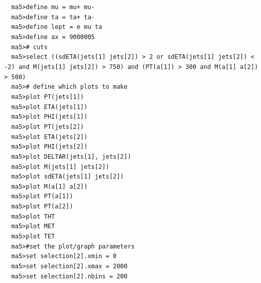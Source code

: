 \documentclass[a4paper, 10pt]{article}
\begin{document}
\texttt{ }\texttt{ }\texttt{ma5>define mu = mu+ mu-\\
}
\texttt{ }\texttt{ }\texttt{ma5>define ta = ta+ ta-\\
}
\texttt{ }\texttt{ }\texttt{ma5>define lept = e mu ta\\
}
\texttt{ }\texttt{ }\texttt{ma5>define ax = 9000005\\
}
\texttt{ }\texttt{ }\texttt{ma5>\# cuts\\
}
\texttt{ }\texttt{ }\texttt{ma5>select ((sdETA(jets[1] jets[2]) > 2 or sdETA(jets[1] jets[2]) < -2) and M(jets[1] jets[2]) > 750) and (PT(a[1]) > 300 and M(a[1] a[2]) > 500)\\
}
\texttt{ }\texttt{ }\texttt{ma5>\# define which plots to make\\
}
\texttt{ }\texttt{ }\texttt{ma5>plot PT(jets[1])\\
}
\texttt{ }\texttt{ }\texttt{ma5>plot ETA(jets[1])\\
}
\texttt{ }\texttt{ }\texttt{ma5>plot PHI(jets[1])\\
}
\texttt{ }\texttt{ }\texttt{ma5>plot PT(jets[2])\\
}
\texttt{ }\texttt{ }\texttt{ma5>plot ETA(jets[2])\\
}
\texttt{ }\texttt{ }\texttt{ma5>plot PHI(jets[2])\\
}
\texttt{ }\texttt{ }\texttt{ma5>plot DELTAR(jets[1], jets[2])\\
}
\texttt{ }\texttt{ }\texttt{ma5>plot M(jets[1] jets[2])\\
}
\texttt{ }\texttt{ }\texttt{ma5>plot sdETA(jets[1] jets[2])\\
}
\texttt{ }\texttt{ }\texttt{ma5>plot M(a[1] a[2])\\
}
\texttt{ }\texttt{ }\texttt{ma5>plot PT(a[1])\\
}
\texttt{ }\texttt{ }\texttt{ma5>plot PT(a[2])\\
}
\texttt{ }\texttt{ }\texttt{ma5>plot THT\\
}
\texttt{ }\texttt{ }\texttt{ma5>plot MET\\
}
\texttt{ }\texttt{ }\texttt{ma5>plot TET\\
}
\texttt{ }\texttt{ }\texttt{ma5>\#set the plot/\-graph parameters\\
}
\texttt{ }\texttt{ }\texttt{ma5>set selection[2].xmin = 0\\
}
\texttt{ }\texttt{ }\texttt{ma5>set selection[2].xmax = 2000\\
}
\texttt{ }\texttt{ }\texttt{ma5>set selection[2].nbins = 200\\
}
\end{document}

